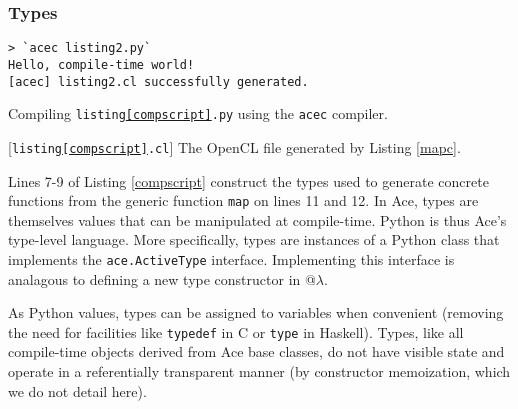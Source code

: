 \subsubsection{Types}
\begin{codelisting}
\begin{lstlisting}[style=Bash]
> `acec listing2.py`
Hello, compile-time world!
[acec] listing2.cl successfully generated.
\end{lstlisting}
\caption{Compiling \texttt{listing\ref{compscript}.py} using the \texttt{acec} compiler.}
\label{mapc}
\end{codelisting}
\begin{codelisting}

\caption{[\texttt{listing\ref{compscript}.cl}] The OpenCL file generated by Listing \ref{mapc}.}
\label{mapout}
\end{codelisting}
Lines 7-9 of Listing \ref{compscript} construct the types used to generate concrete functions from the generic function \verb|map| on lines 11 and 12. In Ace, types are themselves values that can be manipulated at compile-time. Python is thus Ace's type-level language. %
More specifically, types are instances of a Python class that implements the \verb|ace.ActiveType| interface. Implementing this interface is analagous to defining a new type constructor in @$\lambda$. 

As Python values, types can be assigned to variables when convenient (removing the need for  facilities like \verb|typedef| in C or \verb|type| in Haskell). Types, like all compile-time objects derived from Ace base classes, do not have visible state and operate in a referentially transparent manner (by constructor memoization, which we do not detail here).%

